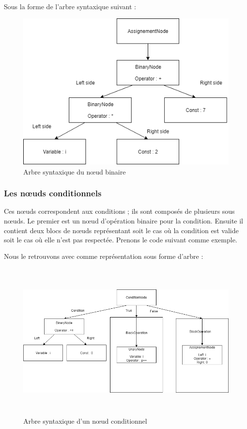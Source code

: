 \documentclass[12pt, twoside, openright]{report}
\begin{document}

Sous la forme de l'arbre syntaxique suivant : 
\begin{center}
    \begin{figure}[H]
        \includegraphics[height=8cm,width=12cm]{Ast/ASTBinaryNode.png}
        \caption{Arbre syntaxique du n\oe{}ud binaire}
    \end{figure}
\end{center}

\subsubsection{Les n\oe{}uds conditionnels}
Ces n\oe{}uds correspondent aux conditions ; ils sont composés de plusieurs sous n\oe{}uds. Le premier est un n\oe{}ud d'opération binaire pour la condition. Ensuite il contient deux blocs de n\oe{}uds représentant soit le cas où la condition est valide soit le cas où elle n'est pas respectée. Prenons le code suivant comme exemple.
    
    Nous le retrouvons avec comme représentation sous forme d'arbre :
    \begin{figure}[H]
        \begin{center}
            \includegraphics[height=8cm,width=14cm]{Ast/ASTIfNode.png}
            \caption{Arbre syntaxique d'un n\oe{}ud conditionnel}
        \end{center}
    \end{figure}
\end{document}
